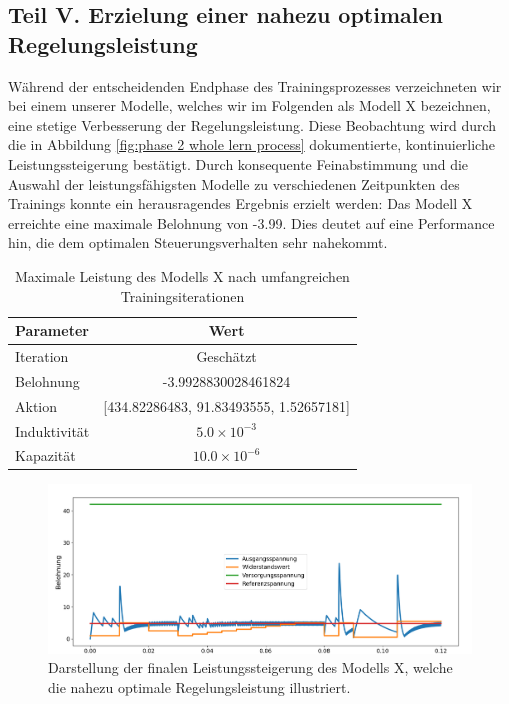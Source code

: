 \subsection{Teil V. Erzielung einer nahezu optimalen Regelungsleistung}
\label{subsec:Achievement_of_Near-Optimal_Control_Performance}

Während der entscheidenden Endphase des Trainingsprozesses verzeichneten wir bei einem unserer Modelle, welches wir im Folgenden als Modell X bezeichnen, eine stetige Verbesserung der Regelungsleistung. Diese Beobachtung wird durch die in Abbildung \ref{fig:phase 2 whole lern process} dokumentierte, kontinuierliche Leistungssteigerung bestätigt. Durch konsequente Feinabstimmung und die Auswahl der leistungsfähigsten Modelle zu verschiedenen Zeitpunkten des Trainings konnte ein herausragendes Ergebnis erzielt werden: Das Modell X erreichte eine maximale Belohnung von -3.99. Dies deutet auf eine Performance hin, die dem optimalen Steuerungsverhalten sehr nahekommt.

\begin{table}[htbp]
\centering
\caption{Maximale Leistung des Modells X nach umfangreichen Trainingsiterationen}
\label{tab:maximum_performance_model_x}
\begin{tabular}{l c}
\hline
\textbf{Parameter} & \textbf{Wert} \\
\hline
Iteration & Geschätzt \\
Belohnung & -3.9928830028461824 \\
Aktion & [434.82286483, 91.83493555, 1.52657181] \\
Induktivität & \( 5.0 \times 10^{-3} \) \\
Kapazität & \( 10.0 \times 10^{-6} \) \\
\hline
\end{tabular}
\end{table}

\begin{figure}[htbp]
\centering
\includegraphics[width=\textwidth]{4Ergebnisse/Phasen/2Phase/TeilV.png}
\caption{Darstellung der finalen Leistungssteigerung des Modells X, welche die nahezu optimale Regelungsleistung illustriert.}
\label{fig:final_performance_model_x}
\end{figure}

